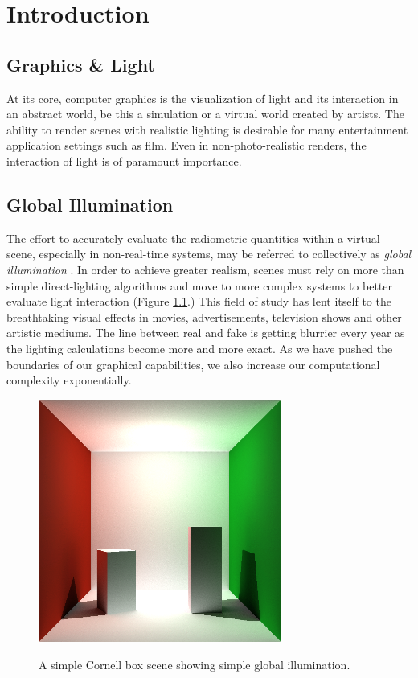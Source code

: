 \documentclass[12pt]{ucthesis}
\newcommand{\captionfonts}{\small\bf\ssp}
\begin{document}
\pagestyle{plain}




\renewcommand{\baselinestretch}{1.66}







\chapter{Introduction}
\label{intro}

\section{Graphics \& Light}
At its core, computer graphics is the visualization of light and its interaction in an abstract world, be this a simulation or a virtual world created by artists.  The ability to render scenes with realistic lighting is desirable for many entertainment application settings such as film.  Even in non-photo-realistic renders, the interaction of light is of paramount importance.

\section{Global Illumination}
The effort to accurately evaluate the radiometric quantities within a virtual scene, especially in non-real-time systems, may be referred to collectively as \textit{global illumination} \cite{verth:2008}.  In order to achieve greater realism, scenes must rely on more than simple direct-lighting algorithms and move to more complex systems to better evaluate light interaction (Figure \ref{fig:cornell}.)  This field of study has lent itself to the breathtaking visual effects in movies, advertisements, television shows and other artistic mediums.  The line between real and fake is getting blurrier every year as the lighting calculations become more and more exact.  As we have pushed the boundaries of our graphical capabilities, we also increase our computational complexity exponentially.

\begin{figure}[h!]
    \centering
    \includegraphics[width=80mm]{img/indirect_box_high.png}
    \captionfonts
    \caption{A simple Cornell box scene showing simple global illumination.}
    \label{fig:cornell}
\end{figure}
\end{document}
